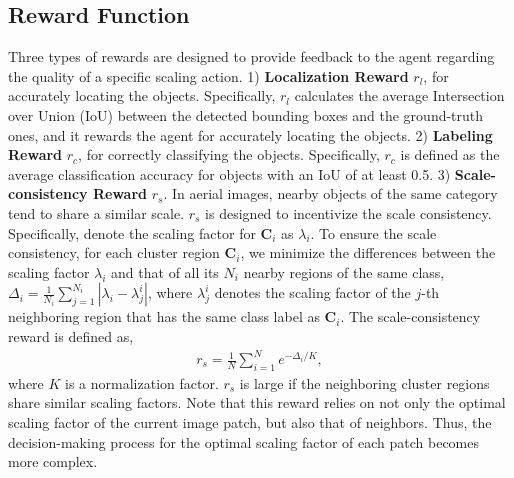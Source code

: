 \documentclass[letterpaper]{article} %
\newcommand\blue[1]{\textcolor{blue}{#1}}
\newcommand\rjf[1]{\textcolor{red}{\{RJF: #1\}}}
\begin{document}

\subsection{Reward Function}
\label{sssec:reward}

Three types of rewards are designed to provide feedback to the agent regarding the quality of a specific scaling action. 1) \textbf{Localization Reward} $r_l$, for accurately locating the objects. Specifically, %
$r_l$ calculates the average Intersection over Union (IoU) between the detected bounding boxes and the ground-truth ones, and it rewards the agent for accurately locating the objects.
2) \textbf{Labeling Reward} $r_c$, for correctly classifying the objects. %
Specifically, $r_c$ is defined as the average classification accuracy for objects with an IoU of at least 0.5.
3) \textbf{Scale-consistency Reward} $r_s$. %
In aerial images, %
nearby objects of the same category tend to share a similar scale. $r_s$ is designed to incentivize the scale consistency. Specifically, denote the scaling factor for $\bm{C}_i$ as $\lambda_i$. To ensure the scale consistency, for each cluster region $\bm{C}_i$, we minimize the differences between the scaling factor $\lambda_i$ and that of all its $N_i$ nearby regions of the same class, $\Delta_i = \frac{1}{N_i}\sum_{j=1}^{N_i} |\lambda_i - \lambda_j^i|$, where $\lambda_j^i$ denotes the scaling factor of the $j$-th neighboring region that has the same class label as $\bm{C}_i$.
The scale-consistency reward is defined as,
\begin{align}\label{eq:rs}
  r_s = \frac{1}{N}\sum_{i=1}^N e^{-\Delta_i/K},
\end{align}
where $K$ is a normalization factor. $r_s$ is large if the neighboring cluster regions share similar scaling factors. %
Note that this reward relies on not only the optimal scaling factor of the current image patch, but also that of neighbors. Thus, the decision-making process for the optimal scaling factor of each patch becomes more complex.
\end{document}
